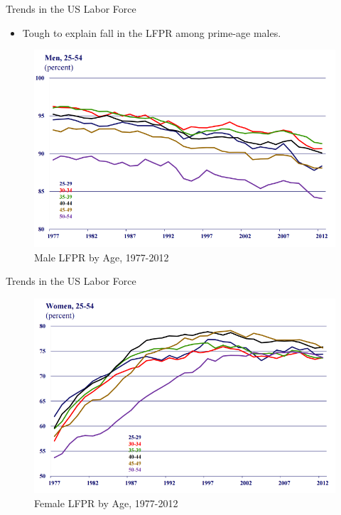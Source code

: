 \documentclass[xcolor={dvipsnames},pdf, hyperref={colorlinks=true, citecolor=ForestGreen, linkcolor=BlueViolet, urlcolor=Magenta}]{beamer}
\theoremstyle{definition}
\begin{document}
	\begin{frame}{Trends in the US Labor Force}
	\begin{itemize}
		\item Tough to explain fall in the LFPR among prime-age males.
	\end{itemize}
	\begin{figure}
		\centering
		\includegraphics[scale=.8]{01B_13.png}
		\caption{Male LFPR by Age, 1977-2012}
	\end{figure}
\end{frame}

	\begin{frame}{Trends in the US Labor Force}
	\begin{figure}
		\centering
		\includegraphics[scale=.9]{01B_14.png}
		\caption{Female LFPR by Age, 1977-2012}
	\end{figure}
	
\end{frame}
\end{document}
